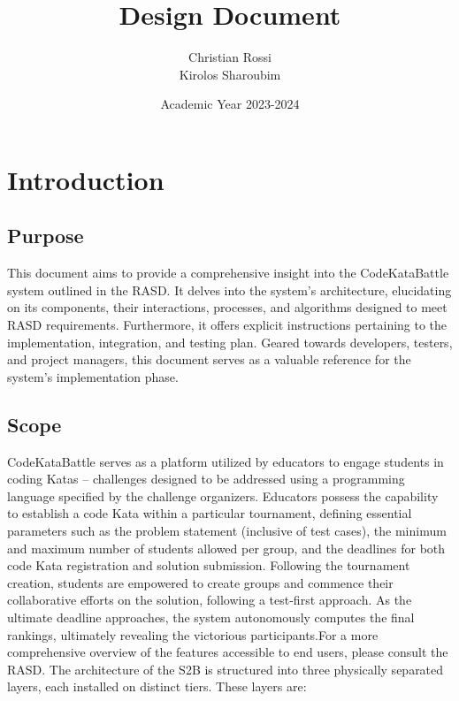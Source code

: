 \documentclass[12pt, a4paper]{report}
\title{Design Document}
\author{Christian Rossi \\ Kirolos Sharoubim}
\date{Academic Year 2023-2024}
\begin{document}
\maketitle

\newpage

\tableofcontents

\newpage

\chapter{Introduction}
    \section{Purpose}
    This document aims to provide a comprehensive insight into the CodeKataBattle system outlined in the RASD.
    It delves into the system's architecture, elucidating on its components,
    their interactions, processes, and algorithms designed to meet RASD requirements. 
    Furthermore, it offers explicit instructions pertaining to the implementation, integration, and testing plan. 
    Geared towards developers, testers, and project managers, this document serves as a valuable reference for the system's implementation phase.

    \section{Scope}
    CodeKataBattle serves as a platform utilized by educators to engage students in coding Katas – challenges designed to be addressed using a programming language specified by the challenge organizers. 
    Educators possess the capability to establish a code Kata within a particular tournament, defining essential parameters such as the problem statement (inclusive of test cases), 
    the minimum and maximum number of students allowed per group, and the deadlines for both code Kata registration and solution submission.
    Following the tournament creation, students are empowered to create groups and commence their collaborative efforts on the solution, following a test-first approach. 
    As the ultimate deadline approaches, the system autonomously computes the final rankings, ultimately revealing the victorious participants.For a more comprehensive overview of the features accessible to end users, please consult the RASD. 
    The architecture of the S2B is structured into three physically separated layers, each installed on distinct tiers. These layers are:
    \\
    
\end{document}
